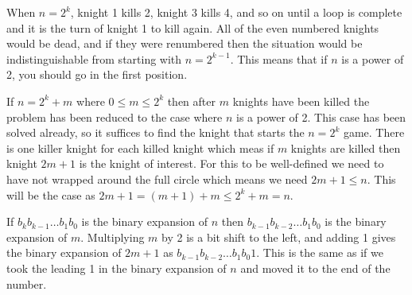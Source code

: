 When $n = 2^k$, knight 1 kills 2, knight 3 kills 4, and so on until a loop is complete and it is the turn of knight 1 to kill again. All of the even numbered knights would be dead, and if they were renumbered then the situation would be indistinguishable from starting with $n = 2^{k - 1}$. This means that if $n$ is a power of 2, you should go in the first position.

If $n = 2^k + m$ where $0 \leq m \le 2^k$ then after $m$ knights have been killed the problem has been reduced to the case where $n$ is a power of 2. This case has been solved already, so it suffices to find the knight that starts the $n = 2^k$ game. There is one killer knight for each killed knight which meas if $m$ knights are killed then knight $2m + 1$ is the knight of interest. For this to be well-defined we need to have not wrapped around the full circle which means we need $2m + 1 \leq n$. This will be the case as $2m + 1 = (m + 1) + m \leq 2^k + m = n$.

If $b_k b_{k-1} \dots b_1 b_0$ is the binary expansion of $n$ then $b_{k-1} b_{k-2} \dots b_1 b_0$ is the binary expansion of $m$. Multiplying $m$ by 2 is a bit shift to the left, and adding 1 gives the binary expansion of $2m + 1$ as $b_{k-1} b_{k-2} \dots b_1 b_0 1$. This is the same as if we took the leading 1 in the binary expansion of $n$ and moved it to the end of the number.
